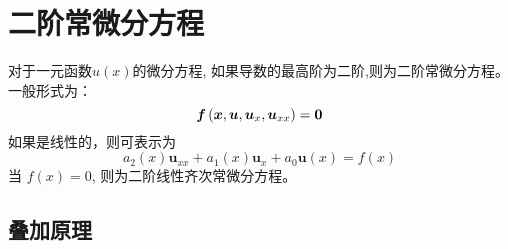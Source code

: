 \section{二阶常微分方程}
对于一元函数$u(x)$的微分方程, 如果导数的最高阶为二阶,则为二阶常微分方程。一般形式为：
\begin{equation}
	\boldsymbol{f}\left(\boldsymbol{x}, \boldsymbol{u}, \boldsymbol{u}_{x}, \boldsymbol{u}_{x x}\right)=\mathbf{0} \\
 \end{equation}
 如果是线性的，则可表示为
 \begin{equation}
	a_2 (x) \boldsymbol{u}_{x x} + a_1 (x)\boldsymbol{u}_{x} + a_0\boldsymbol{u}(x)  = f(x)
 \end{equation}
 当 $  f(x)=0 $, 则为二阶线性齐次常微分方程。\\

\subsection{叠加原理} ~\\

